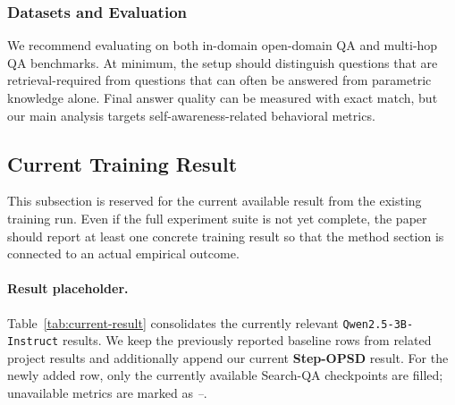 \documentclass[11pt]{article}
\begin{document}
\subsubsection{Datasets and Evaluation}
We recommend evaluating on both in-domain open-domain QA and multi-hop QA benchmarks. At minimum, the setup should distinguish questions that are retrieval-required from questions that can often be answered from parametric knowledge alone. Final answer quality can be measured with exact match, but our main analysis targets self-awareness-related behavioral metrics.

\subsection{Current Training Result}
This subsection is reserved for the current available result from the existing training run. Even if the full experiment suite is not yet complete, the paper should report at least one concrete training result so that the method section is connected to an actual empirical outcome.

\paragraph{Result placeholder.}
Table~\ref{tab:current-result} consolidates the currently relevant
\texttt{Qwen2.5-3B-Instruct} results. We keep the previously reported baseline
rows from related project results and additionally append our current
\textbf{Step-OPSD} result. For the newly added row, only the currently available
Search-QA checkpoints are filled; unavailable metrics are marked as
\textit{--}.
\end{document}
